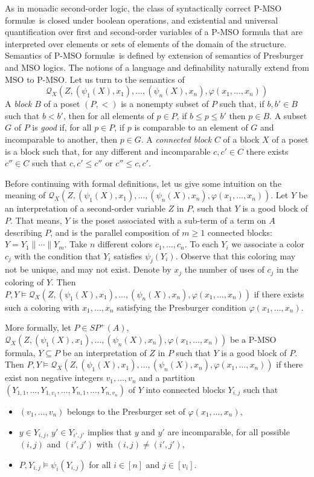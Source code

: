 \documentclass{CSML}
\begin{document}
As in monadic second-order logic, the class of syntactically correct P-MSO formul{\ae}\ is closed under boolean operations, and existential and universal quantification over first and second-order variables of a P-MSO formula that are interpreted over elements or sets of elements of the domain of the structure.
Semantics of P-MSO formul{\ae}\ is defined by extension of semantics of Presburger and MSO logics.
The notions of a language  and definability naturally extend from MSO to P-MSO.
Let us turn to the semantics of $$\mathcal{Q}_X(Z,(\psi_1(X),x_1),\dots,(\psi_n(X),x_n),\varphi(x_1,\dots,x_n))$$
A \emph{block} $B$ of a poset $(P,<)$ is a nonempty subset of $P$ such that, if $b,b'\in B$ such that $b<b'$, then for all elements of $p\in P$, if $b\leq p\leq b'$ then $p\in B$. 
A subset $G$ of $P$ is \emph{good} if, for all $p\in P$, if $p$ is comparable to an element of $G$ and incomparable to another, then $p\in G$. 
A \emph{connected block} $C$ of a block $X$ of a poset is a block such that, for any different and incomparable $c,c'\in C$ there exists $c''\in C$ such that $c,c'\leq c''$ or $c''\leq c,c'$.
 
Before continuing with formal definitions, let us give some intuition on the meaning of $\mathcal{Q}_X(Z,(\psi_1(X),x_1),\dots,(\psi_n(X),x_n),\varphi(x_1,\dots,x_n))$. Let $Y$ be an interpretation of a second-order variable $Z$ in $P$, such that $Y$ is a good block of $P$. That means, $Y$ is the poset associated with a sub-term of a term on $A$ describing $P$, and is the parallel composition of $m\geq 1$ connected blocks: $Y=Y_1\parallel\cdots\parallel Y_m$. Take $n$ different colors $c_1,\dots,c_n$. To each $Y_i$ we associate a color $c_j$ with the condition that $Y_i$ satisfies $\psi_j(Y_i)$. Observe that this coloring may not be unique, and may not exist. Denote by $x_j$ the number of uses of $c_j$ in the coloring of $Y$. Then $P,Y\models \mathcal{Q}_X(Z,(\psi_1(X),x_1),\dots,(\psi_n(X),x_n),\varphi(x_1,\dots,x_n))$ if there exists such a coloring with $x_1,\dots,x_n$ satisfying the Presburger condition $\varphi(x_1,\dots,x_n)$.

More formally,
 let $P\in SP^+(A)$, $\mathcal{Q}_X(Z,(\psi_1(X),x_1),\dots,(\psi_n(X),x_n),\varphi(x_1,\dots,x_n))$ be a P-MSO formula, $Y\subseteq P$ be an interpretation of $Z$ in $P$ such that $Y$ is a good block of $P$. Then $P,Y\models \mathcal{Q}_X(Z,(\psi_1(X),x_1),\dots,(\psi_n(X),x_n),\varphi(x_1,\dots,x_n))$ if there exist non negative integers $v_1,\dots,v_n$ and a partition $(Y_{1,1},\dots,Y_{1,v_1},\dots,Y_{n,1},\dots,Y_{n,v_n})$ of $Y$ into connected blocks $Y_{i,j}$ such that
 \begin{itemize}
 \item $(v_1,\dots,v_n)$ belongs to the Presburger set of $\varphi(x_1,\dots,x_n)$,
 \item $y\in Y_{i,j}$, $y'\in Y_{i',j'}$ implies that $y$ and $y'$ are incomparable, for all possible $(i,j)$ and $(i',j')$ with $(i,j)\not=(i',j')$,
 \item $P,Y_{i,j}\models \psi_i(Y_{i,j})$ for all $i\in[n]$ and $j\in[v_i]$.
 \end{itemize}
\end{document}
